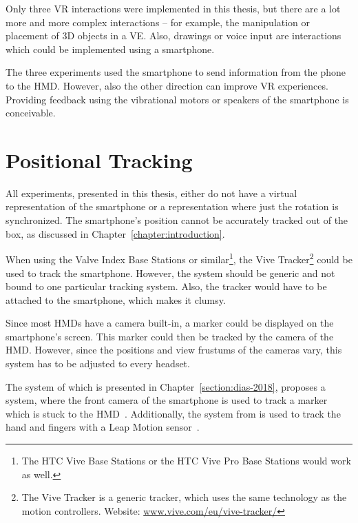 Only three \gls{VR} interactions were implemented in this thesis, but there are a lot more and more complex interactions -- for example, the manipulation or placement of \gls{3D} objects in a \gls{VE}. Also, drawings or voice input are interactions which could be implemented using a smartphone. %

The three experiments used the smartphone to send information from the phone to the \gls{HMD}. However, also the other direction can improve \gls{VR} experiences. Providing feedback using the vibrational motors or speakers of the smartphone is conceivable.


\section{Positional Tracking}\label{section:fw-positional-tracking}

All experiments, presented in this thesis, either do not have a virtual representation of the smartphone or a representation where just the rotation is synchronized. The smartphone's position cannot be accurately tracked out of the box, as discussed in Chapter~\ref{chapter:introduction}.

When using the Valve Index Base Stations or similar\footnote{The HTC Vive Base Stations or the HTC Vive Pro Base Stations would work as well.}, the Vive Tracker\footnote{The Vive Tracker is a generic tracker, which uses the same technology as the motion controllers. Website: \href{https://www.vive.com/eu/vive-tracker/}{www.vive.com/eu/vive-tracker/}} could be used to track the smartphone. However, the system should be generic and not bound to one particular tracking system. Also, the tracker would have to be attached to the smartphone, which makes it clumsy.

Since most \glspl{HMD} have a camera built-in, a marker could be displayed on the smartphone's screen. This marker could then be tracked by the camera of the \gls{HMD}. However, since the positions and view frustums of the cameras vary, this system has to be adjusted to every headset.

The system of \citeauthor{Dias.2018} which is presented in Chapter~\ref{section:dias-2018}, proposes a system, where the front camera of the smartphone is used to track a marker which is stuck to the \gls{HMD}~\cite[4]{Dias.2018}. Additionally, the system from \citeauthor{Afonso.2017} is used to track the hand and fingers with a Leap Motion sensor~\cite[247]{Afonso.2017}.

